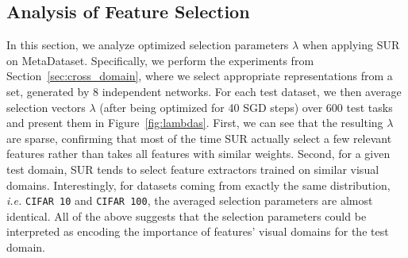 \documentclass[runningheads]{llncs}
\begin{document}
\subsection{Analysis of Feature Selection}
In this section, we analyze optimized selection parameters ${\lambda}$ when
applying SUR on MetaDataset. Specifically, we perform the experiments from
Section~\ref{sec:cross_domain}, where we select appropriate representations from
a set, generated by 8 independent networks. For each test dataset, we then
average selection vectors ${\lambda}$ (after being optimized for 40 SGD
steps) over 600 test tasks and present them in Figure~\ref{fig:lambdas}.
First, we can see that the resulting ${\lambda}$ are sparse, confirming that most of the time
SUR actually select a few relevant features rather than takes all features with
similar weights. Second, for a given test domain, SUR tends to select feature
extractors trained on similar visual domains. Interestingly, for datasets coming
from exactly the same distribution, \textit{i.e.} \texttt{CIFAR 10} and \texttt{CIFAR
  100}, the averaged selection parameters are almost identical. All of the above
suggests that the selection parameters could be interpreted as encoding the
importance of features’ visual domains for the test domain.
\end{document}
